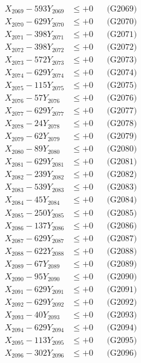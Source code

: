 \documentclass[a4paper,10pt]{article}
\begin{document}
{\begin{align}
X_{2069} - 593Y_{2069} &\leq +0 && \text{(G2069)} \\
X_{2070} - 629Y_{2070} &\leq +0 && \text{(G2070)} \\
\allowbreak
X_{2071} - 398Y_{2071} &\leq +0 && \text{(G2071)} \\
X_{2072} - 398Y_{2072} &\leq +0 && \text{(G2072)} \\
X_{2073} - 572Y_{2073} &\leq +0 && \text{(G2073)} \\
X_{2074} - 629Y_{2074} &\leq +0 && \text{(G2074)} \\
X_{2075} - 115Y_{2075} &\leq +0 && \text{(G2075)} \\
X_{2076} - 57Y_{2076} &\leq +0 && \text{(G2076)} \\
X_{2077} - 629Y_{2077} &\leq +0 && \text{(G2077)} \\
X_{2078} - 24Y_{2078} &\leq +0 && \text{(G2078)} \\
X_{2079} - 62Y_{2079} &\leq +0 && \text{(G2079)} \\
X_{2080} - 89Y_{2080} &\leq +0 && \text{(G2080)} \\
\allowbreak
X_{2081} - 629Y_{2081} &\leq +0 && \text{(G2081)} \\
X_{2082} - 239Y_{2082} &\leq +0 && \text{(G2082)} \\
X_{2083} - 539Y_{2083} &\leq +0 && \text{(G2083)} \\
X_{2084} - 45Y_{2084} &\leq +0 && \text{(G2084)} \\
X_{2085} - 250Y_{2085} &\leq +0 && \text{(G2085)} \\
X_{2086} - 137Y_{2086} &\leq +0 && \text{(G2086)} \\
X_{2087} - 629Y_{2087} &\leq +0 && \text{(G2087)} \\
X_{2088} - 622Y_{2088} &\leq +0 && \text{(G2088)} \\
X_{2089} - 67Y_{2089} &\leq +0 && \text{(G2089)} \\
X_{2090} - 95Y_{2090} &\leq +0 && \text{(G2090)} \\
\allowbreak
X_{2091} - 629Y_{2091} &\leq +0 && \text{(G2091)} \\
X_{2092} - 629Y_{2092} &\leq +0 && \text{(G2092)} \\
X_{2093} - 40Y_{2093} &\leq +0 && \text{(G2093)} \\
X_{2094} - 629Y_{2094} &\leq +0 && \text{(G2094)} \\
X_{2095} - 113Y_{2095} &\leq +0 && \text{(G2095)} \\
X_{2096} - 302Y_{2096} &\leq +0 && \text{(G2096)} \\

\end{align}}
\end{document}
